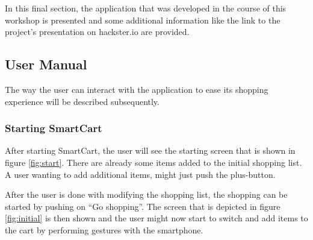 In this final section, the application that was developed in the course of this
workshop is presented and some additional information like the link to the
project's presentation on hackster.io are provided.

\subsection{User Manual}
The way the user can interact with the application to
ease its shopping experience will be described subsequently.

\subsubsection{Starting SmartCart}
After starting SmartCart, the user will see the starting screen that is shown in
figure \ref{fig:start}. There are already some items added to the initial
shopping list. A user wanting to add additional items, might just push the
plus-button.

After the user is done with modifying the shopping list, the shopping can
be started by pushing on ``Go shopping''. The screen that is depicted in figure
\ref{fig:initial} is then shown and the user might now start to switch and add
items to the cart by performing gestures with the smartphone.

